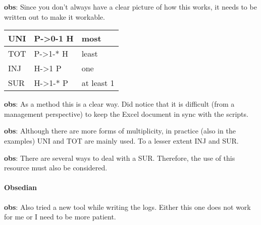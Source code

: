 \begin{obs}\label{obs:rq2-5:2-10}
    \textbf{obs}: Since you don't always have a clear picture of how this works, it needs to be written out to make it workable.\\
    \begin{tabular}{ || l | l | l ||}
    \hline
    UNI & P->0-1 H &  most\\  \hline    
    TOT & P->1-* H  & least\\  \hline
    INJ & H->1 P  &   one\\  \hline
    SUR & H->1-* P &  at least 1\\ \hline
    \end{tabular}
\end{obs}
    
\begin{obs}\label{obs:rq1-3}
    \textbf{obs}: As a method this is a clear way.
    Did notice that it is difficult (from a management perspective) to keep the Excel document in sync with the scripts.
\end{obs}

\begin{obs}\label{obs:rq2-2}
    \textbf{obs}: Although there are more forms of {multiplicity}, in practice (also in the examples) UNI and TOT are mainly used.
    To a lesser extent INJ and SUR.
\end{obs}

\begin{obs}\label{obs:rq2-13:19-10}
    \textbf{obs}: There are several ways to deal with a SUR.
    Therefore, the use of this resource must also be considered.
\end{obs}

\paragraph{Obsedian}
\begin{obs}\label{obs:rq1-88:5-12}
    \textbf{obs}: Also tried a new tool while writing the logs.
    Either this one does not work for me or I need to be more patient.
\end{obs}

